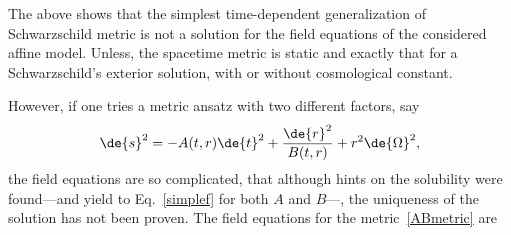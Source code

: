 The above shows that the simplest time-dependent generalization of Schwarzschild metric is not a solution for the field equations of the considered affine model. Unless, the spacetime metric is static and exactly that for a Schwarzschild's exterior solution, with or without cosmological constant.

However, if one tries a metric ansatz with two different factors, say
\begin{equation}
  \de{s}^2 = - A(t,r) \de{t}^2 + \frac{ \de{r}^2 }{ B(t,r) } + r^2 \de{\Omega}^2,
  \label{ABmetric}
\end{equation}
the field equations are so complicated, that although hints on the solubility were found---and yield to Eq.~\eqref{simplef} for both $A$ and $B$---, the uniqueness of the solution has not been proven. The field equations for the metric~\eqref{ABmetric} are %
